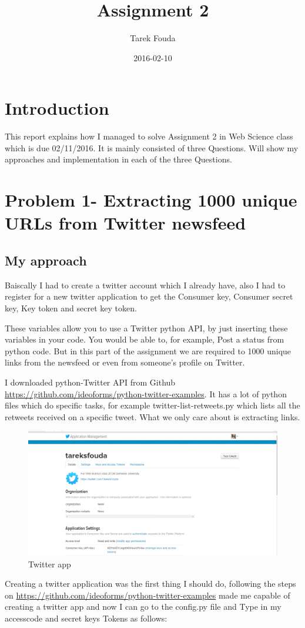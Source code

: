 \documentclass{article}
\title{Assignment 2}
\date{2016-02-10}
\author{Tarek Fouda}
\begin{document}
  \maketitle
\section{Introduction}
This report explains how I managed to solve Assignment 2 in Web Science class which is due 02/11/2016. It is mainly consisted of three Questions. Will show my approaches and implementation in each of the three Questions.

\section{Problem 1- Extracting 1000 unique URLs from Twitter newsfeed}

\subsection{My approach}

Baiscally I had to create a twitter account which I already have, also I had to register for a new twitter application to get the Consumer key, Consumer secret key, Key token and secret key token.

These variables allow you to use a Twitter python  API, by just inserting these variables in your code. You would be able to, for example, Post a status from python code.
But in this part of the assignment we are required to 1000 unique links from the newsfeed or even from someone's profile on Twitter.

I downloaded python-Twitter API from Github \url{https://github.com/ideoforms/python-twitter-examples}. It has a lot of python files which do specific tasks, for example twitter-list-retweets.py which lists all the retweets received on a specific tweet. What we only care about is extracting links.
\begin{figure}
\centering
\includegraphics[scale=0.35]{appstwitterQ1.png}
\caption{Twitter app}
\label{fig:appstwitterQ1}
\end{figure}
Creating a twitter application was the first thing I should do, following the steps on \url{https://github.com/ideoforms/python-twitter-examples} made me capable of creating a twitter app and now I can go to the config.py file and Type in my accesscode and secret keys Tokens as follows:
\end{document}
